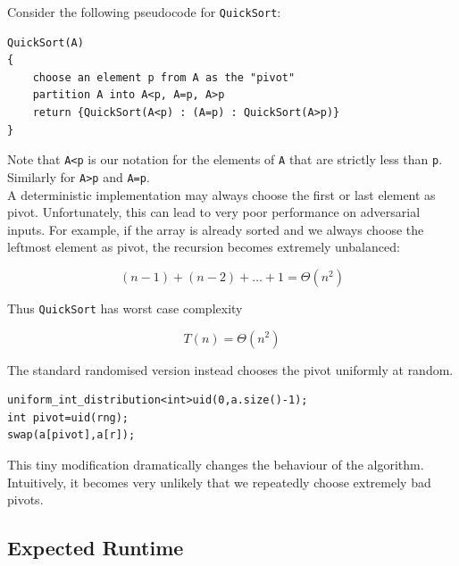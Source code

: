 \documentclass[11pt,openany]{book}
\begin{document}
Consider the following pseudocode for \texttt{QuickSort}:
\begin{center}
\begin{minipage}{0.9\linewidth}
\begin{framed}
\begin{Verbatim}
QuickSort(A)
{
    choose an element p from A as the "pivot"
    partition A into A<p, A=p, A>p
    return {QuickSort(A<p) : (A=p) : QuickSort(A>p)}
}
\end{Verbatim}
\vspace{-4mm}
\end{framed}
\end{minipage}
\end{center}

\noindent Note that \texttt{A<p} is our notation for the elements of \texttt{A} that are strictly less than \texttt{p}.
Similarly for \texttt{A>p} and \texttt{A=p}.\\


\noindent A deterministic implementation may always choose the first or last element as pivot. 
Unfortunately, this can lead to very poor performance on adversarial inputs. 
For example, if the array is already sorted and we always choose the leftmost element as 
pivot, the recursion becomes extremely unbalanced:

\[
(n-1)+(n-2)+\dots+1
=
\Theta(n^2)
\]

\noindent Thus \texttt{QuickSort} has worst case complexity

\[
T(n)=\Theta(n^2)
\]

\noindent The standard randomised version instead chooses the pivot uniformly at random.

\begin{center}
\begin{minipage}{0.9\linewidth}
\begin{framed}
\begin{Verbatim}
uniform_int_distribution<int>uid(0,a.size()-1);
int pivot=uid(rng);
swap(a[pivot],a[r]);
\end{Verbatim}
\vspace{-4mm}
\end{framed}
\end{minipage}
\end{center}

\noindent This tiny modification dramatically changes the behaviour of the algorithm. Intuitively, it becomes very unlikely that we repeatedly choose extremely bad pivots.

\subsection{Expected Runtime}
\end{document}
